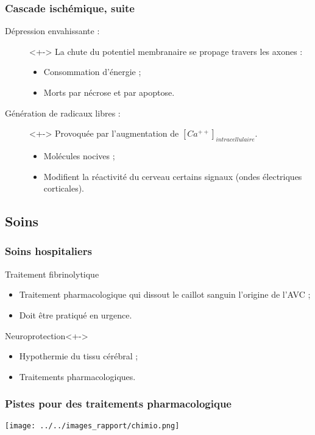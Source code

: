 \begin{frame}
\frametitle{Cascade isch\'emique, suite}
\begin{description}
\item[D\'epression envahissante :]<+-> La chute du potentiel membranaire se propage  travers les axones :
\begin{itemize}
\item Consommation d'\'energie ;
\item Morts par n\'ecrose et par apoptose.
\end{itemize}
%
\item[G\'en\'eration de radicaux libres :]<+-> Provoqu\'ee par l'augmentation de $[Ca^{++}]_{intracellulaire}$.
\begin{itemize}
\item<+-> Mol\'ecules nocives ;
\item<+-> Modifient la r\'eactivit\'e du cerveau  certains signaux (ondes \'electriques corticales).
\end{itemize}
\end{description}
\end{frame}

\subsection{Soins}

\begin{frame}
\frametitle{Soins hospitaliers}
\begin{block}{Traitement fibrinolytique}
\begin{itemize}
\item<+-> Traitement pharmacologique qui dissout le caillot sanguin  l'origine de l'AVC ;
\item<+-> Doit \^etre pratiqu\'e en urgence.
\end{itemize}
\end{block}
%
\begin{block}{Neuroprotection}<+->
\begin{itemize}
\item<+-> Hypothermie du tissu c\'er\'ebral ;
\item<+-> Traitements pharmacologiques.
\end{itemize}
\end{block}
\end{frame}

\begin{frame}
\frametitle{Pistes pour des traitements pharmacologique}

\texttt{[image: ../../images\_rapport/chimio.png]}
\end{frame}

